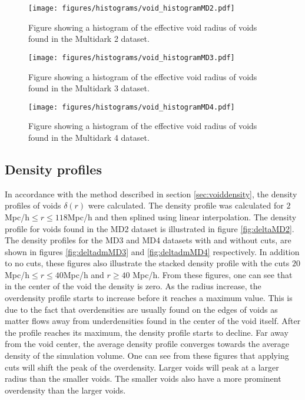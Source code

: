 \begin{figure}[H]
    \texttt{[image: figures/histograms/void\_histogramMD2.pdf]}
    \caption{Figure showing a histogram of the effective void radius of voids found in the Multidark 2 dataset.}
    \label{fig:voidhistMD2}
\end{figure}
\begin{figure}[H]
    \texttt{[image: figures/histograms/void\_histogramMD3.pdf]}
    \caption{Figure showing a histogram of the effective void radius of voids found in the Multidark 3 dataset.}
    \label{fig:voidhistMD3}
\end{figure}
\begin{figure}[H]
    \texttt{[image: figures/histograms/void\_histogramMD4.pdf]}
    \caption{Figure showing a histogram of the effective void radius of voids found in the Multidark 4 dataset.}
    \label{fig:voidhistMD4}
\end{figure}
\subsection{Density profiles}
In accordance with the method described in section \ref{sec:voiddensity}, the density profiles of voids $\delta(r)$ were calculated. The density profile was calculated for $2$Mpc/h$\leq r\leq 118$Mpc/h and then splined using linear interpolation. The density profile for voids found in the MD2 dataset is illustrated in figure \ref{fig:deltaMD2}. The density profiles for the MD3 and MD4 datasets with and without cuts, are shown in figures \ref{fig:deltadmMD3} and \ref{fig:deltadmMD4} respectively. In addition to no cuts, these figures also illustrate the stacked density profile with the cuts $20$Mpc/h$\leq r\leq 40$Mpc/h and $r\geq 40$ Mpc/h. From these figures, one can see that in the center of the void the density is zero. As the radius increase, the overdensity profile starts to increase before it reaches a maximum value. This is due to the fact that overdensities are usually found on the edges of voids as matter flows away from underdensities found in the center of the void itself. After the profile reaches its maximum, the density profile starts to decline. Far away from the void center, the average density profile converges towards the average density of the simulation volume. One can see from these figures that applying cuts will shift the peak of the overdensity. Larger voids will peak at a larger radius than the smaller voids. The smaller voids also have a more prominent overdensity than the larger voids.\\\indent
 

